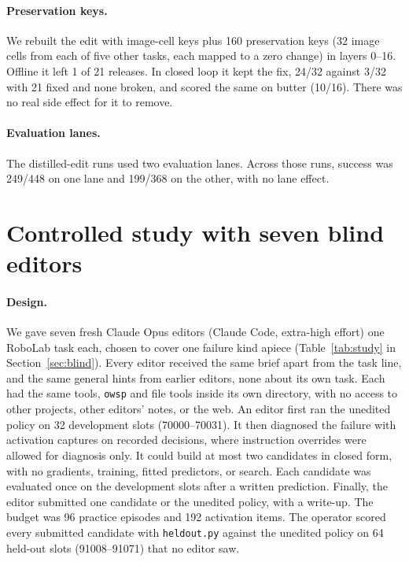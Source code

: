 \documentclass{article}
\begin{document}
\paragraph{Preservation keys.} We rebuilt the edit with image-cell keys plus 160 preservation keys (32 image cells from each of five other tasks, each mapped to a zero change) in layers 0--16. Offline it left 1 of 21 releases. In closed loop it kept the fix, 24/32 against 3/32 with 21 fixed and none broken, and scored the same on butter (10/16). There was no real side effect for it to remove.

\paragraph{Evaluation lanes.} The distilled-edit runs used two evaluation lanes. Across those runs, success was 249/448 on one lane and 199/368 on the other, with no lane effect.

\FloatBarrier
\section{Controlled study with seven blind editors}
\label{app:study}
\paragraph{Design.} We gave seven fresh Claude Opus editors (Claude Code, extra-high effort) one RoboLab task each, chosen to cover one failure kind apiece (Table~\ref{tab:study} in Section~\ref{sec:blind}). Every editor received the same brief apart from the task line, and the same general hints from earlier editors, none about its own task. Each had the same tools, \texttt{owsp} and file tools inside its own directory, with no access to other projects, other editors' notes, or the web. An editor first ran the unedited policy on 32 development slots (70000--70031). It then diagnosed the failure with activation captures on recorded decisions, where instruction overrides were allowed for diagnosis only. It could build at most two candidates in closed form, with no gradients, training, fitted predictors, or search. Each candidate was evaluated once on the development slots after a written prediction. Finally, the editor submitted one candidate or the unedited policy, with a write-up. The budget was 96 practice episodes and 192 activation items. The operator scored every submitted candidate with \texttt{heldout.py} against the unedited policy on 64 held-out slots (91008--91071) that no editor saw.
\end{document}
